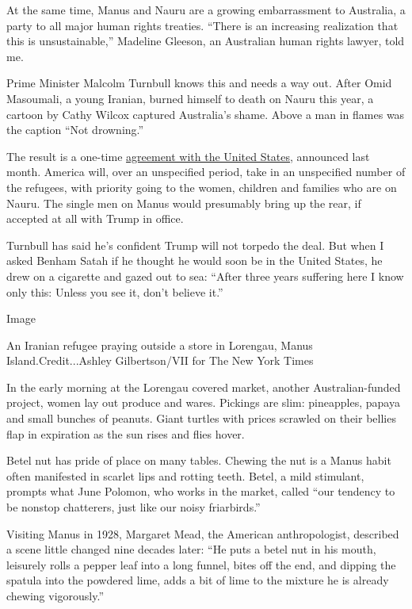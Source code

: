 At the same time, Manus and Nauru are a growing embarrassment to
Australia, a party to all major human rights treaties. ``There is an
increasing realization that this is unsustainable,'' Madeline Gleeson,
an Australian human rights lawyer, told me.

Prime Minister Malcolm Turnbull knows this and needs a way out. After
Omid Masoumali, a young Iranian, burned himself to death on Nauru this
year, a cartoon by Cathy Wilcox captured Australia's shame. Above a man
in flames was the caption ``Not drowning.''

The result is a one-time
\href{https://www.nytimes.com/2016/11/25/world/australia/refugee-deal-united-states-nations.html?_r=0}{agreement
with the United States}, announced last month. America will, over an
unspecified period, take in an unspecified number of the refugees, with
priority going to the women, children and families who are on Nauru. The
single men on Manus would presumably bring up the rear, if accepted at
all with Trump in office.

Turnbull has said he's confident Trump will not torpedo the deal. But
when I asked Benham Satah if he thought he would soon be in the United
States, he drew on a cigarette and gazed out to sea: ``After three years
suffering here I know only this: Unless you see it, don't believe it.''

Image

An Iranian refugee praying outside a store in Lorengau, Manus
Island.Credit...Ashley Gilbertson/VII for The New York Times

In the early morning at the Lorengau covered market, another
Australian-funded project, women lay out produce and wares. Pickings are
slim: pineapples, papaya and small bunches of peanuts. Giant turtles
with prices scrawled on their bellies flap in expiration as the sun
rises and flies hover.

Betel nut has pride of place on many tables. Chewing the nut is a Manus
habit often manifested in scarlet lips and rotting teeth. Betel, a mild
stimulant, prompts what June Polomon, who works in the market, called
``our tendency to be nonstop chatterers, just like our noisy
friarbirds.''

Visiting Manus in 1928, Margaret Mead, the American anthropologist,
described a scene little changed nine decades later: ``He puts a betel
nut in his mouth, leisurely rolls a pepper leaf into a long funnel,
bites off the end, and dipping the spatula into the powdered lime, adds
a bit of lime to the mixture he is already chewing vigorously.''

